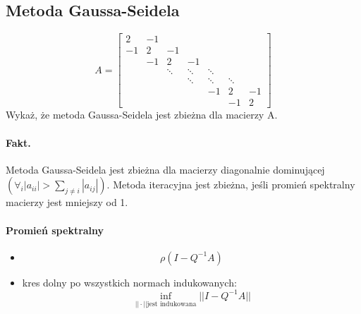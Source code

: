 \documentclass{article}
\begin{document}
\subsection{Metoda Gaussa-Seidela}
$$A=\begin{bmatrix}
	2&-1&&&&\\
	-1&2&-1&&&&\\
	&-1&2&-1&&&\\
	&&\ddots&\ddots&\ddots&&\\
	&&&\ddots&\ddots&\ddots&\\
	&&&&-1&2&-1\\
	&&&&&-1&2
\end{bmatrix}$$
Wykaż, że metoda Gaussa-Seidela jest zbieżna dla macierzy A.
\paragraph{Fakt.} Metoda Gaussa-Seidela jest zbieżna dla macierzy diagonalnie dominującej $ (\forall_{i}|a_{ii}|>\sum_{j\not=i}|a_{ij}|) $.
Metoda iteracyjna jest zbieżna, jeśli promień spektralny macierzy jest mniejszy od 1.
\paragraph{Promień spektralny} 
\begin{itemize}
	\item$$ \rho(I-Q^{-1}A) $$
	\item kres dolny po wszystkich normach indukowanych:
	$$\inf_{||\cdot||\text{jest indukowana}}||I-Q^{-1}A ||$$
\end{itemize}
\end{document}
